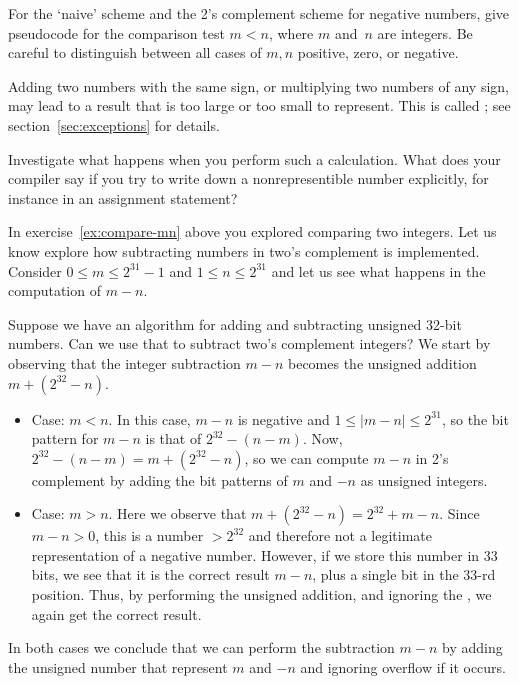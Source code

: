 \begin{exercise}
  \label{ex:compare-mn}
  For the `naive' scheme and the 2's complement scheme for negative
  numbers, give pseudocode for the comparison test $m<n$, where $m$
  and~$n$ are integers. Be careful to distinguish between all cases of
  $m,n$ positive, zero, or negative.
\end{exercise}

Adding two numbers with the same sign, or multiplying two numbers of
any sign, may lead to a result that is too
large or too small to represent. This is called ;
see section~\ref{sec:exceptions} for details.

\begin{exercise}
  Investigate what happens when you perform such a calculation. What
  does your compiler say if you try to write down a nonrepresentible
  number explicitly, for instance in an assignment statement?
\end{exercise}

In exercise~\ref{ex:compare-mn} above you explored comparing two integers.
Let us know explore how 
subtracting numbers in two's complement is implemented. Consider $0\leq
m\leq 2^{31}-1$ and $1\leq n\leq 2^{31}$ and let us see what happens
in the computation of $m-n$. 

Suppose we have an algorithm for adding and subtracting unsigned
32-bit numbers. Can we use that to subtract two's complement integers?
We start by observing that the integer subtraction $m-n$ becomes the
unsigned addition $m+(2^{32}-n)$.
\begin{itemize}
\item Case: $m<{n}$. In this case, $m-n$ is negative and $1\leq
  |m-n|\leq 2^{31}$, so the bit pattern for $m-n$ is that of
  $2^{32}-(n-m)$. Now, $2^{32}-(n-m)=m+(2^{32}-n)$, so we can compute
  $m-n$ in 2's complement by adding the bit patterns of $m$ and $-n$ as
  unsigned integers.
\item Case: $m>n$. Here we observe that
  $m+(2^{32}-n)=2^{32}+m-n$. Since $m-n>0$, this is a number $>2^{32}$
  and therefore not a legitimate
  representation of a negative number. However, if we store this
  number in 33 bits, we see that it is
  the correct result $m-n$, plus a single bit in the
  33-rd position. Thus, by performing the unsigned addition, and
  ignoring the , we again get the correct result.
\end{itemize}
In both cases we conclude that we can perform the subtraction $m-n$ by adding
the unsigned number that represent $m$ and $-n$
and ignoring overflow if it occurs.


